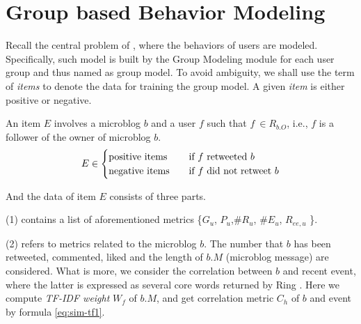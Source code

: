 \section{Group based Behavior Modeling}
\label{sec:gm}



Recall the central problem of \sys{}, where the \retg{} behaviors of users are modeled.
Specifically, such model is built by the Group Modeling module for each user group and thus named as group model.
To avoid ambiguity, we shall use the term of \textit{items} to denote the data for training the group model.
A given \textit{item} is either positive or negative.

\begin{definition}
\label{def:gm-it}
An item $E$ involves a microblog $b$ and a user $f$ such that $f\ \in R_{b.O}$, i.e., $f$ is a follower of  the owner of microblog $b$.
\begin{equation}
\label{eq:gm-it}
E \in
  \begin{cases}
    \text{positive items}       & \quad \text{if } f \text{ retweeted{} } b\\
    \text{negative items}  		& \quad \text{if } f \text{ did not retweet{} } b
  \end{cases}
\end{equation}
\end{definition}

And the data of item $E$ consists of three parts.

	\stab(1)  contains a list of aforementioned metrics \{$G_u$, $P_u$,\#$R_u$, \#$E_u$, $R_{ee,u}$ \}.
	

\stab(2)  refers to metrics related to the microblog $b$.
The number that $b$ has been retweeted, commented, liked and the length of $b.M$ (microblog message) are considered.
What is more, we consider the correlation between $b$ and recent event, where the latter is expressed as several core words returned by Ring \cite{IEEEexample:ring}.
Here we compute \textit{TF-IDF weight} $W_f$ of $b.M$, and get correlation metric $C_h$ of $b$ and event by formula \ref{eq:sim-tf1}.

